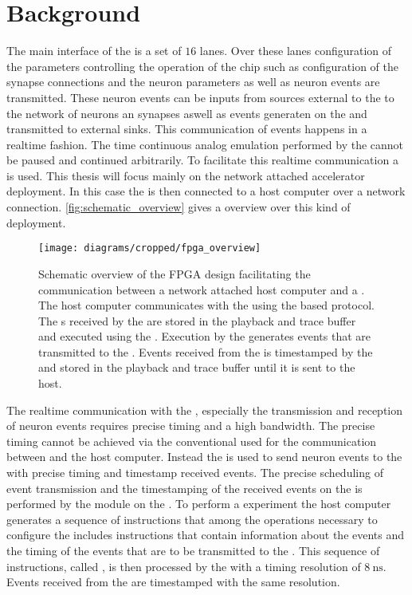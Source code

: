 \section{Background}
The main interface of the \HICANNX{} \ASIC{} is a set of $\num{16}$ \LVDS{} lanes. Over these \LVDS{} lanes configuration of the parameters controlling the operation of the chip such as configuration of the synapse connections and the neuron parameters as well as neuron events are transmitted. These neuron events can be inputs from sources external to the \ASIC{} to the network of neurons an synapses aswell as events generaten on the \ASIC{} and transmitted to external sinks.
This communication of events happens in a realtime fashion. The time continuous analog emulation performed by the \ASIC{} cannot be paused and continued arbitrarily. To facilitate this realtime communication a \FPGA{} is used. This thesis will focus mainly on the network attached accelerator deployment. In this case the  \FPGA{} is then connected to a host computer over a network connection. \autoref{fig:schematic_overview} gives a overview over this kind of deployment.
\begin{figure}
\centerline{\texttt{[image: diagrams/cropped/fpga\_overview]}}
\caption{Schematic overview of the FPGA design facilitating the communication between a network attached host computer and a \HICANNX{} \ASIC{}. The host computer communicates with the \FPGA{} using the \UDP{} based \HostARQ{} protocol. The \PlaybackProgram{}s received by the \FPGA{} are stored in the playback and trace buffer and executed using the \pbexec{}. Execution by the \pbexec{} generates events that are transmitted to the \ASIC{}. Events received from the \ASIC{} is timestamped by the \pbexec{} and stored in the playback and trace buffer until it is sent to the host.}\label{fig:schematic_overview}
\end{figure}

The realtime communication with the \ASIC{}, especially the transmission and reception of neuron events  requires precise timing and a high bandwidth\autocite{ref:precise_timing}. The precise timing cannot be achieved via the conventional \Gigabitethernet{} used for the communication between \FPGA{} and the host computer.
Instead the \FPGA{} is used to send neuron events to the \ASIC{} with precise timing and timestamp received events. The precise scheduling of event transmission and the timestamping of the received events on the \FPGA{} is performed by the \pbexec{} module on the \FPGA{}.
To perform a experiment the host computer generates a sequence of instructions that among the operations necessary to configure the \ASIC{} includes instructions that contain information about the events and the timing of the events that are to be transmitted to the \ASIC{}. This sequence of instructions, called \PlaybackProgram{}, is then processed by the \pbexec{} with a timing resolution of $\SI{8}{\nano\second}$.
Events received from the \ASIC{} are timestamped with the same resolution.

